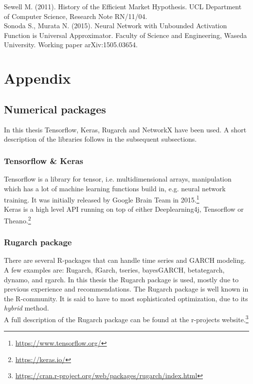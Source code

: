 \documentclass[12pt, letterpaper]{amsart}%
\begin{document}
Sewell M. (2011). History of the Efficient Market Hypothesis. UCL Department of Computer Science, Research Note RN/11/04.
\\

Sonoda S., Murata N. (2015). Neural Network with Unbounded Activation Function is Universal Approximator. Faculty of Science and Engineering, Waseda University. Working paper arXiv:1505.03654.



\newpage

\section{Appendix}

\subsection{Numerical packages}
In this thesis Tensorflow, Keras, Rugarch and NetworkX have been used. A short description of the libraries follows in the subsequent subsections.

\subsubsection{Tensorflow \& Keras}
Tensorflow is a library for tensor, i.e. multidimensional arrays, manipulation which has a lot of machine learning functions build in, e.g. neural network training. It was initially released by Google Brain Team in 2015.\footnote{\url{https://www.tensorflow.org/}}
\\

Keras is a high level API running on top of either Deeplearning4j, Tensorflow or Theano.\footnote{\url{https://keras.io/}}

\subsubsection{Rugarch package}
There are several R-packages that can handle time series and GARCH modeling. A few examples are: Rugarch, fGarch, tseries, bayesGARCH, betategarch, dynamo, and rgarch. In this thesis the Rugarch package is used, mostly due to previous experience and recommendations. The Rugarch package is well known in the R-community. It is said to have to most sophisticated optimization, due to its \textit{hybrid} method.
\\

A full description of the Rugarch package can be found at the r-projects website.\footnote{\url{https://cran.r-project.org/web/packages/rugarch/index.html}}
\\
\end{document}
